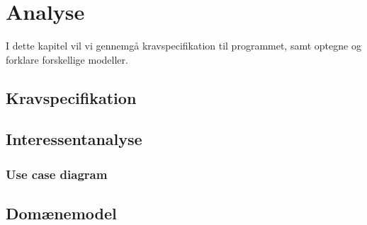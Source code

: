 \chapter{Analyse}

I dette kapitel vil vi gennemgå kravspecifikation til programmet, samt optegne og forklare forskellige modeller.


\section{Kravspecifikation}



\section{Interessentanalyse}

\subsection{Use case diagram}

\section{Domænemodel}